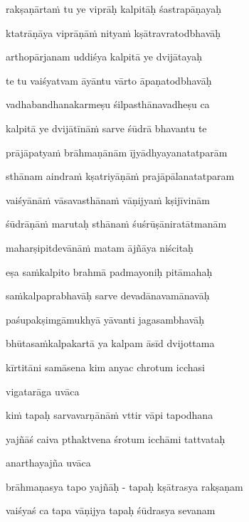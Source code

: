 rakṣaṇārta\.m tu ye viprāḥ kalpitāḥ śastrapāṇayaḥ\thinspace{\dandab} \dontdisplaylinenum

ktatrāṇāya viprāṇā\.m nitya\.m kṣātravratodbhavāḥ \veg\dontdisplaylinenum

arthopārjanam uddiśya kalpitā ye dvijātayaḥ\thinspace{\dandab} \dontdisplaylinenum

te tu vaiśyatvam āyāntu vārto āpaṇatodbhavāḥ \danda\dontdisplaylinenum

vadhabandhanakarmeṣu śilpasthānavadheṣu ca \veg\dontdisplaylinenum

kalpitā ye dvijātīnā\.m sarve śūdrā bhavantu te\thinspace{\dandab} \dontdisplaylinenum

prājāpatya\.m brāhmaṇānām ījyādhyayanatatparām \veg\dontdisplaylinenum

sthānam aindra\.m kṣatriyāṇā\.m prajāpālanatatparam\thinspace{\dandab} \dontdisplaylinenum

vaiśyānā\.m vāsavasthāna\.m vāṇijya\.m kṣijīvinām \veg\dontdisplaylinenum

śūdrāṇā\.m marutaḥ sthāna\.m śuśrūṣāniratātmanām\thinspace{\dandab} \dontdisplaylinenum

maharṣipitdevānā\.m matam ājñāya niścitaḥ \danda\dontdisplaylinenum

eṣa sa\.mkalpito brahmā padmayoniḥ pitāmahaḥ \veg\dontdisplaylinenum

sa\.mkalpaprabhavāḥ sarve devadānavamānavāḥ\thinspace{\dandab} \dontdisplaylinenum

paśupakṣimgāmukhyā yāvanti jagasambhavāḥ \veg\dontdisplaylinenum

bhūtasa\.mkalpakartā ya kalpam āsīd dvijottama\thinspace{\dandab} \dontdisplaylinenum

kīrtitāni samāsena kim anyac chrotum icchasi \veg\dontdisplaylinenum

vigatarāga uvāca~{\dandab}\dontdisplaylinenum 

ki\.m tapaḥ sarvavarṇānā\.m vttir vāpi tapodhana\thinspace{\danda} \dontdisplaylinenum

yajñāś caiva pthaktvena śrotum icchāmi tattvataḥ \veg\dontdisplaylinenum

anarthayajña uvāca~{\dandab}\dontdisplaylinenum 

brāhmaṇasya tapo yajñāḥ - tapaḥ kṣātrasya rakṣaṇam\thinspace{\danda} \dontdisplaylinenum

vaiśyaś ca tapa vāṇijya tapaḥ śūdrasya sevanam \veg\dontdisplaylinenum

